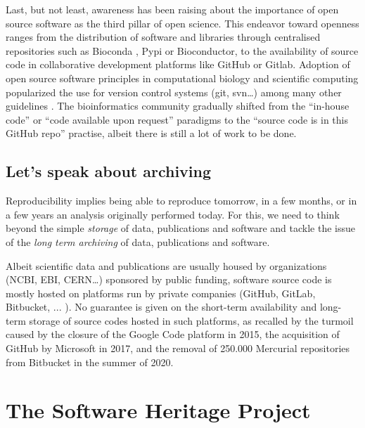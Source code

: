 \documentclass[long, final]{jobim}
\begin{document}
Last, but not least, awareness has been raising about the importance of open source software as the third pillar of open science. This endeavor toward openness ranges from the distribution of software and libraries through centralised repositories such as Bioconda \cite{gruning2018a}, Pypi or Bioconductor, to the availability of source code in collaborative development platforms like GitHub or Gitlab. Adoption of open source software principles in computational biology and scientific computing popularized the use for version control systems (git, svn\ldots) among many other guidelines \cite{wilson2014,taschuk2017,jimenez2017}. The bioinformatics community gradually shifted from the “in-house code” or “code available upon request” paradigms to the “source code is in this GitHub repo” practise, albeit there is still a lot of work to be done\cite{cadwallader2021}.


\subsection{Let’s speak about archiving}
\label{sec:archiving}

Reproducibility implies being able to reproduce tomorrow, in a few months, or in a few years an analysis originally performed today.  For this, we need to think beyond the simple \textit{storage} of data, publications and software and tackle the issue of the \textit{long term archiving} of data, publications and software. 

Albeit scientific data and publications are usually housed by organizations (NCBI, EBI, CERN…) sponsored by public funding, software source code is mostly hosted on platforms run by private companies (GitHub, GitLab, Bitbucket, ... ). No guarantee is given on the short-term availability and long-term storage of source codes hosted in such platforms, as recalled by the turmoil caused by the closure of the Google Code platform in 2015, the acquisition of GitHub by Microsoft in 2017, and the removal of 250.000 Mercurial repositories from Bitbucket in the summer of 2020.



\section{The Software Heritage Project}
\label{sec:SWH}
\end{document}
